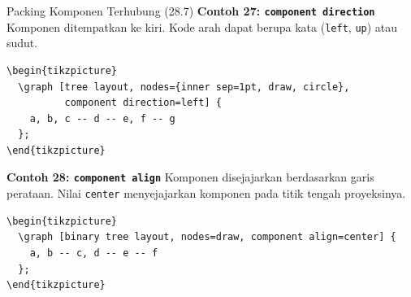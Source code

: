 \documentclass[aspectratio=169]{beamer}
\begin{document}
\begin{frame}{Packing Komponen Terhubung (28.7)}
\textbf{Contoh 27: \texttt{component direction}}
Komponen ditempatkan ke kiri. Kode arah dapat berupa kata (\texttt{left}, \texttt{up}) atau sudut.
\begin{lstlisting}
\begin{tikzpicture}
  \graph [tree layout, nodes={inner sep=1pt, draw, circle},
          component direction=left] {
    a, b, c -- d -- e, f -- g
  };
\end{tikzpicture}
\end{lstlisting}
\begin{center}\end{center}


\textbf{Contoh 28: \texttt{component align}}
Komponen disejajarkan berdasarkan garis perataan. Nilai \texttt{center} menyejajarkan komponen pada titik tengah proyeksinya.
\begin{lstlisting}
\begin{tikzpicture}
  \graph [binary tree layout, nodes=draw, component align=center] {
    a, b -- c, d -- e -- f
  };
\end{tikzpicture}
\end{lstlisting}
\begin{center}\end{center}



\end{frame}
\end{document}
